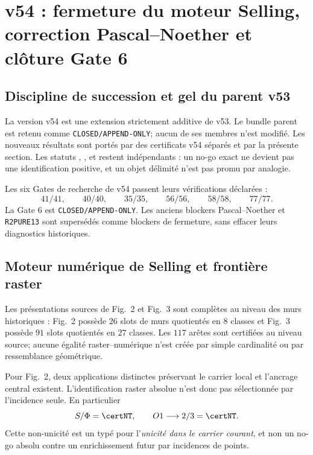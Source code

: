 \clearpage
\section{v54 : fermeture du moteur Selling, correction Pascal--Noether et clôture Gate 6}\label{sec:v54}

\subsection{Discipline de succession et gel du parent v53}

La version v54 est une extension strictement additive de v53. Le bundle parent est retenu comme
\texttt{CLOSED/APPEND-ONLY}; aucun de ses membres n'est modifié. Les nouveaux résultats sont
portés par des certificats v54 séparés et par la présente section. Les statuts \certProven,
\certRefuted, \certNT{} et \certSeparated{} restent indépendants : un no-go exact ne devient
pas une identification positive, et un objet \certNT{} délimité n'est pas promu par analogie.

\begin{proposition}\label{prop:v54-gates}
Les six Gates de recherche de v54 passent leurs vérifications déclarées :
\[
41/41,\qquad 40/40,\qquad 35/35,\qquad 56/56,\qquad 58/58,
\qquad 77/77.
\]
La Gate 6 est \texttt{CLOSED/APPEND-ONLY}. Les anciens blockers Pascal--Noether et
\texttt{R2PURE13} sont supersédés comme blockers de fermeture, sans effacer leurs diagnostics
historiques.
\end{proposition}

\subsection{Moteur numérique de Selling et frontière raster}

Les présentations sources de Fig.~2 et Fig.~3 sont complètes au niveau des murs historiques :
Fig.~2 possède $26$ slots de murs quotientés en $8$ classes et Fig.~3 possède $91$ slots
quotientés en $27$ classes. Les $117$ arêtes sont certifiées au niveau source; aucune égalité
raster--numérique n'est créée par simple cardinalité ou par ressemblance géométrique.

Pour Fig.~2, deux applications distinctes préservant le carrier local et l'ancrage central existent.
L'identification raster absolue n'est donc pas sélectionnée par l'incidence seule. En particulier
\[
 S/\Phi=\certNT,
 \qquad O1\longrightarrow 2/3=\certNT.
\]
Cette non-unicité est un \certRefuted{} typé pour l'\emph{unicité dans le carrier courant}, et non
un no-go absolu contre un enrichissement futur par incidences de points.

